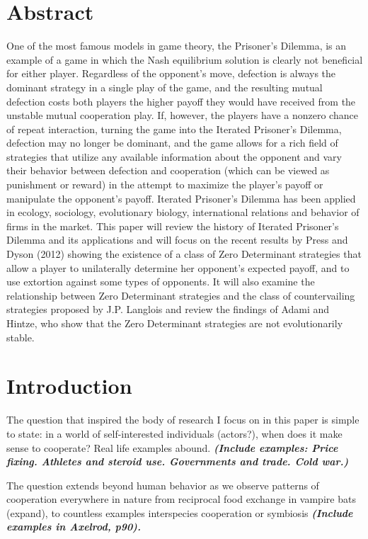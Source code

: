 

\chapter{Abstract}
One of the most famous models in game theory, the Prisoner's Dilemma, is an example of a game in which the Nash equilibrium solution is clearly not beneficial for either player. Regardless of the opponent's move, defection is always the dominant strategy in a single play of the game, and the resulting mutual defection costs both players the higher payoff they would have received from the unstable mutual cooperation play. If, however, the players have a nonzero chance of repeat interaction, turning the game into the Iterated Prisoner's Dilemma, defection may no longer be dominant, and the game allows for a rich field of strategies that utilize any available information about the opponent and vary their behavior between defection and cooperation (which can be viewed as punishment or reward) in the attempt to maximize the player's payoff or manipulate the opponent's payoff. Iterated Prisoner's Dilemma has been applied in ecology, sociology, evolutionary biology, international relations and behavior of firms in the market. This paper will review the history of Iterated Prisoner's Dilemma and its applications and will focus on the recent results by Press and Dyson (2012) showing the existence of a class of Zero Determinant strategies that allow a player to unilaterally determine her opponent's expected payoff, and to use extortion against some types of opponents. It will also examine the relationship between Zero Determinant strategies and the class of countervailing strategies proposed by J.P. Langlois and review the findings of Adami and Hintze, who show that the Zero Determinant strategies are not evolutionarily stable.

\chapter{Introduction}

The question that inspired the body of research I focus on in this paper is simple to state: in a world of self-interested individuals (actors?), when does it make sense to cooperate?  Real life examples abound. \textit{\textbf{(Include examples: Price fixing. Athletes and steroid use. Governments and trade. Cold war.)}}

The question extends beyond human behavior as we observe patterns of cooperation everywhere in nature from reciprocal food exchange in vampire bats (expand), to countless examples interspecies cooperation or symbiosis \textit{\textbf{(Include examples in Axelrod, p90).}}

